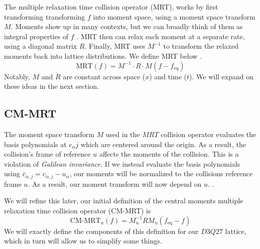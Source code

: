 The multiple relaxation time collision operator (MRT),
works by first transforming transforming $f$ into moment space,
using a moment space transform $M$.
Moments show up in many contexts, but we can broadly think of them
as integral properties of $f$ \cite{Taber2018}.
MRT then can relax each moment at a separate rate, using a diagonal matrix $R$.
Finally, MRT uses $M^{-1}$ to transform the relaxed moments
back into lattice distributions. We define MRT below \cite{De2017}.
$$
\text{MRT}(f) = M^{-1} \cdot R \cdot M (f - f_{\text{eq}})
$$
Notably, $M$ and $R$ are constant across space ($x$) and time ($t$).
We will expand on these ideas in the next section.

\subsection{CM-MRT}\label{sec:cm-mrt}
The moment space transform $M$ used in the $MRT$ collision operator
evaluates the basis polynomials at $c_{\alpha}j$
which are centered around the origin.
As a result, the collision's frame of reference $u$ affects the 
moments of the collision.
This is a violation of \textit{Galilean invariance}.
If we instead evaluate the basis polynomials using 
$\bar{c}_{\alpha,j} = c_{\alpha, j} - u_{\alpha}$,
our moments will be normalized to the collisions reference frame $u$. 
As a result, our moment transform will now depend on $u$. \cite{De2017, De2019}.


We will refine this later, our initial definition of 
the central moments multiple relaxation time collision operator (CM-MRT) 
is
$$\label{eqn:cm_mrt_def_init}
\text{CM-MRT}_{u}(f) = M_u^{-1} R  M_u(f_{\text{eq}} - f)
$$
We will exactly define the components of this definition for our
$D3Q27$ lattice, which in turn will allow us to simplify some things.

